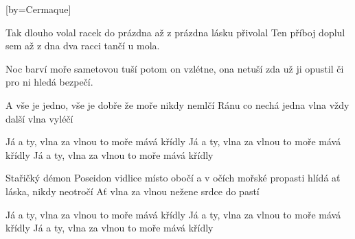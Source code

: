[by={Cermaque}]

\beginverse{}
Tak dlouho volal racek do prázdna
až z prázdna lásku přivolal
Ten příboj doplul sem až z dna
dva racci tančí u mola.
\endverse{}

\beginverse{}
Noc barví moře sametovou tuší
potom on vzlétne, ona netuší
zda už ji opustil
či pro ni hledá bezpečí.
\endverse{}

\beginverse{}
A vše je jedno, vše je dobře
že moře nikdy nemlčí
Ránu co nechá jedna vlna
vždy další vlna vyléčí
\endverse{}

\beginchorus{}
Já a ty, vlna za vlnou
to moře mává křídly
Já a ty, vlna za vlnou
to moře mává křídly
Já a ty, vlna za vlnou
to moře mává křídly
\endchorus{}

\beginverse{}
Stařičký démon Poseidon
vidlice místo obočí
a v očích mořské propasti
hlídá ať láska, nikdy neotročí
Ať vlna za vlnou
nežene srdce do pastí
\endverse{}

\beginchorus{}
Já a ty, vlna za vlnou
to moře mává křídly
Já a ty, vlna za vlnou
to moře mává křídly
Já a ty, vlna za vlnou
to moře mává křídly
\endchorus{}

\endsong{}
